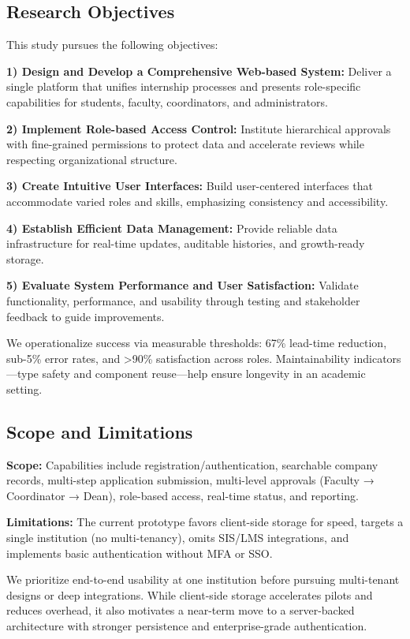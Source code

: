\documentclass[conference]{IEEEtran}
\begin{document}
\subsection{Research Objectives}
This study pursues the following objectives:

\textbf{1) Design and Develop a Comprehensive Web-based System:} Deliver a single platform that unifies internship processes and presents role-specific capabilities for students, faculty, coordinators, and administrators.

\textbf{2) Implement Role-based Access Control:} Institute hierarchical approvals with fine-grained permissions to protect data and accelerate reviews while respecting organizational structure.

\textbf{3) Create Intuitive User Interfaces:} Build user-centered interfaces that accommodate varied roles and skills, emphasizing consistency and accessibility.

\textbf{4) Establish Efficient Data Management:} Provide reliable data infrastructure for real-time updates, auditable histories, and growth-ready storage.

\textbf{5) Evaluate System Performance and User Satisfaction:} Validate functionality, performance, and usability through testing and stakeholder feedback to guide improvements.

We operationalize success via measurable thresholds: 67\% lead-time reduction, sub-5\% error rates, and >90\% satisfaction across roles. Maintainability indicators—type safety and component reuse—help ensure longevity in an academic setting.

\subsection{Scope and Limitations}
\textbf{Scope:} Capabilities include registration/authentication, searchable company records, multi-step application submission, multi-level approvals (Faculty → Coordinator → Dean), role-based access, real-time status, and reporting.

\textbf{Limitations:} The current prototype favors client-side storage for speed, targets a single institution (no multi-tenancy), omits SIS/LMS integrations, and implements basic authentication without MFA or SSO.

We prioritize end-to-end usability at one institution before pursuing multi-tenant designs or deep integrations. While client-side storage accelerates pilots and reduces overhead, it also motivates a near-term move to a server-backed architecture with stronger persistence and enterprise-grade authentication.
\end{document}
